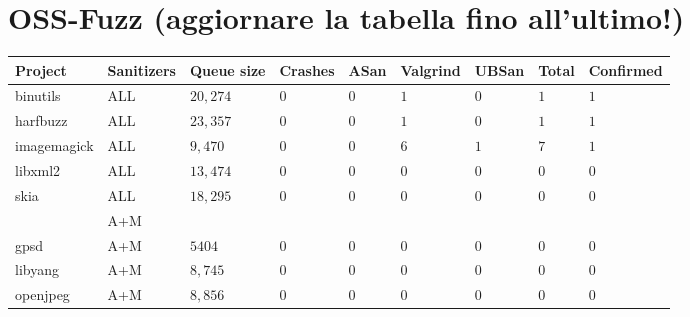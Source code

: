 \section{OSS-Fuzz (aggiornare la tabella fino all'ultimo!)} \label{ossfuzz-table}
\begin{adjustbox}{width=\textwidth,center}
\begin{tabular}{|l|l|l|l|l|l|l|l|l|}
\hline
\textbf{Project} & \textbf{Sanitizers} & \textbf{Queue size} & \textbf{Crashes} & \textbf{ASan} & \textbf{Valgrind} & \textbf{UBSan} & \textbf{Total} & \textbf{Confirmed}  \\ 
\hline
binutils         & ALL                 & $20,274$            & $0$              & $0$           & $1$           & $0$            & $1$             & $1$                 \\
harfbuzz         & ALL                 & $23,357$            & $0$              & $0$           & $1$           & $0$            & $1$             & $1$                 \\
imagemagick      & ALL                 & $9,470$             & $0$              & $0$           & $6$           & $1$            & $7$             & $1$                 \\
libxml2          & ALL                 & $13,474$            & $0$              & $0$           & $0$           & $0$            & $0$             & $0$                 \\
skia             & ALL                 & $18,295$            & $0$              & $0$           & $0$           & $0$            & $0$             & $0$                 \\ 
\hline
\ziosaba{???}      & A+M                 & \ziosaba{???}             & \ziosaba{???}              & \ziosaba{???}           & \ziosaba{???}        & \ziosaba{???}            & \ziosaba{???}           & \ziosaba{???}               \\
gpsd    & A+M                 & $5404$               & $0$              & $0$           & $0$           & $0$            & $0$             & $0$                 \\
libyang          & A+M                 & $8,745$             & $0$              & $0$           & $0$           & $0$            & $0$             & $0$                 \\
openjpeg         & A+M                 & $8,856$             & $0$              & $0$           & $0$           & $0$            & $0$             & $0$                 \\

\end{tabular}
\end{adjustbox}
